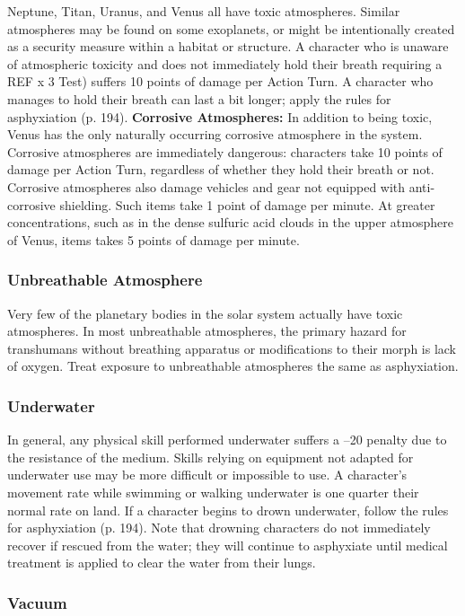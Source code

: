 Neptune, Titan, Uranus, and Venus all have toxic 
atmospheres. Similar atmospheres may be found on 
some exoplanets, or might be intentionally created as 
a security measure within a habitat or structure.
A character who is unaware of atmospheric toxicity 
and does not immediately hold their breath requiring
a REF x 3 Test) suffers 10 points of damage per
Action Turn. A character who manages to hold their 
breath can last a bit longer; apply the rules for asphyxiation
(p. 194).
\textbf{Corrosive Atmospheres:} In addition to being toxic, 
Venus has the only naturally occurring corrosive atmosphere
in the system. Corrosive atmospheres are
immediately dangerous: characters take 10 points of 
damage per Action Turn, regardless of whether they 
hold their breath or not. Corrosive atmospheres also 
damage vehicles and gear not equipped with anti-corrosive
shielding. Such items take 1 point of damage
per minute. At greater concentrations, such as in the 
dense sulfuric acid clouds in the upper atmosphere of 
Venus, items takes 5 points of damage per minute.

\subsubsection{Unbreathable Atmosphere}

Very few of the planetary bodies in the solar system 
actually have toxic atmospheres. In most unbreathable 
atmospheres, the primary hazard for transhumans 
without breathing apparatus or modifications to their 
morph is lack of oxygen. Treat exposure to unbreathable
atmospheres the same as asphyxiation.

\subsubsection{Underwater}

In general, any physical skill performed underwater suffers
a –20 penalty due to the resistance of the medium.
Skills relying on equipment not adapted for underwater
use may be more difficult or impossible to use. A
character's movement rate while swimming or walking 
underwater is one quarter their normal rate on land. 
If a character begins to drown underwater, follow the 
rules for asphyxiation (p. 194). Note that drowning 
characters do not immediately recover if rescued from 
the water; they will continue to asphyxiate until medical 
treatment is applied to clear the water from their lungs.

\subsubsection{Vacuum}

